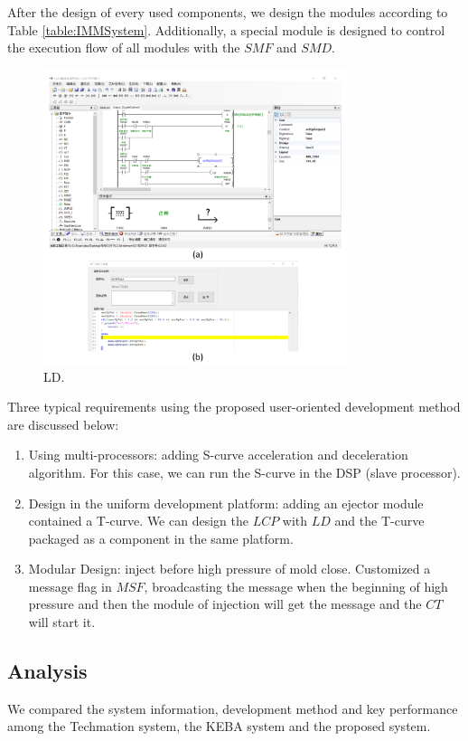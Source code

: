 \documentclass[journal,UTF8]{IEEEtran}
\begin{document}
After the design of every used components, we design the modules according to Table \ref{table:IMMSystem}. Additionally, a special module is designed to control the execution flow of all modules with the $SMF$ and $SMD$.

\begin{figure}
	\centering
	\includegraphics[width=3.5in]{fig/ld.pdf}
	\caption{LD.}
	\label{fig:ld}
\end{figure}

Three typical requirements using the proposed user-oriented development method are discussed below:
\begin{enumerate}
	\item Using multi-processors: adding S-curve acceleration and deceleration algorithm. For this case, we can run the S-curve in the DSP (slave processor).
	\item Design in the uniform development platform: adding an ejector module contained a T-curve. We can design the $LCP$ with $LD$ and the T-curve packaged as a component in the same platform.
	\item Modular Design: inject before high pressure of mold close. Customized a message flag in $MSF$, broadcasting the message when the beginning of high pressure and then the module of injection will get the message and the $CT$ will start it.
\end{enumerate}
\subsection{Analysis}
We compared the system information, development method and key performance among the Techmation system, the KEBA system and the proposed system.
\end{document}
